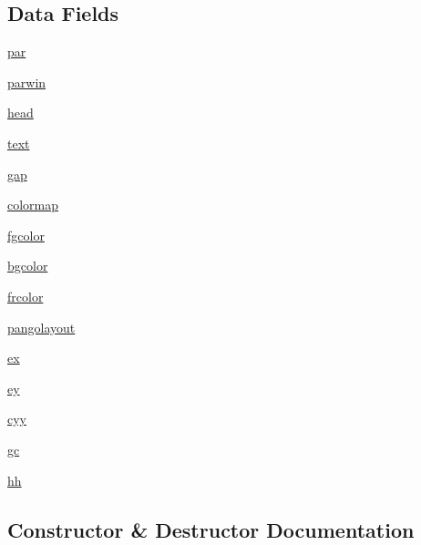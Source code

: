 \subsection*{Data Fields}
\begin{DoxyCompactItemize}
\item 
\hyperlink{classyellow_1_1stick_doc_a8a4e5ec5926f293767f3c555868e4c21}{par}
\item 
\hyperlink{classyellow_1_1stick_doc_af77a598ca5e5c4b3f9e19410edb7b5dc}{parwin}
\item 
\hyperlink{classyellow_1_1stick_doc_a434acd167ada209c34621739b6b8c583}{head}
\item 
\hyperlink{classyellow_1_1stick_doc_af575f17e6be3f269b86b041a60560dbf}{text}
\item 
\hyperlink{classyellow_1_1stick_doc_ac3572d35c0534d609c7df7c1b85f62bc}{gap}
\item 
\hyperlink{classyellow_1_1stick_doc_af6498084a79f833610813077daf71faa}{colormap}
\item 
\hyperlink{classyellow_1_1stick_doc_a350f90598ea332f936fea59cd1d149d7}{fgcolor}
\item 
\hyperlink{classyellow_1_1stick_doc_abc9ea27789a0328b83443cfe81b3e99f}{bgcolor}
\item 
\hyperlink{classyellow_1_1stick_doc_a7392854aec942bde0c9865f4b2fdbd5b}{frcolor}
\item 
\hyperlink{classyellow_1_1stick_doc_acadcfbe9531a84473f5c2dd3cefec767}{pangolayout}
\item 
\hyperlink{classyellow_1_1stick_doc_a7343e1995b4263df542facd235c7f129}{ex}
\item 
\hyperlink{classyellow_1_1stick_doc_a376b04dd893dc07de5fd20a21f7a08df}{ey}
\item 
\hyperlink{classyellow_1_1stick_doc_a3c777c2e882501a60f073f47e75ca153}{cyy}
\item 
\hyperlink{classyellow_1_1stick_doc_a4ba1825606cdadc883059651caa3ff4b}{gc}
\item 
\hyperlink{classyellow_1_1stick_doc_ae61e7de603852182385da5e907b4b232}{hh}
\end{DoxyCompactItemize}


\subsection{Constructor \& Destructor Documentation}
\mbox{\label{classyellow_1_1stick_doc_a6e4af27ccdc132f24f6e1cf523a4532b}} 
